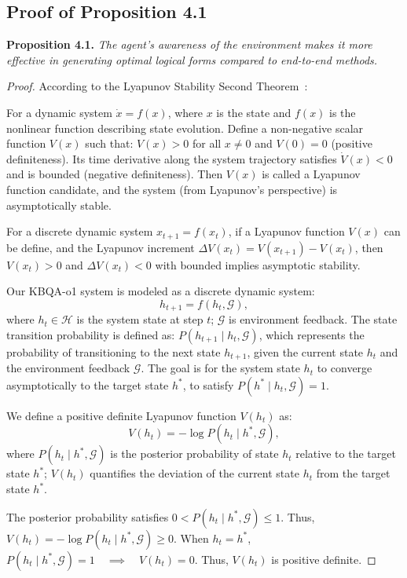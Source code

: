 \documentclass{article}
\theoremstyle{plain}
\theoremstyle{definition}
\theoremstyle{remark}
\begin{document}
\subsection{Proof of Proposition 4.1}
\label{proof1}
\textbf{Proposition 4.1.}
\textit{The agent's awareness of the environment makes it more effective in generating optimal logical forms compared to end-to-end methods.}
\begin{proof} 
According to the Lyapunov Stability Second Theorem~\cite{Lyapunov}: 

For a dynamic system $\dot{x} = f(x)$, where $x$ is the state and $f(x)$ is the nonlinear function describing state evolution. Define a non-negative scalar function $V(x)$  such that: $V(x) > 0$ for all $x \neq 0$ and $V(0) = 0$ (positive definiteness). Its time derivative along the system trajectory satisfies $\dot{V}(x)<0$ and is bounded (negative definiteness). Then $V(x)$ is called a Lyapunov function candidate, and the system (from Lyapunov’s perspective) is asymptotically stable.

For a discrete dynamic system  $x_{t+1} = f(x_t)$, if a Lyapunov function $V(x)$ can be define, and the Lyapunov increment $\Delta V(x_t) = V(x_{t+1}) - V(x_t)$, then $V(x_t) > 0$  and $\Delta V(x_t) < 0$ with bounded implies asymptotic stability.

Our KBQA-o1 system is modeled as a discrete dynamic system:
\begin{equation}
h_{t+1} = f(h_t, \mathcal{G}),
\end{equation}
where $h_t \in \mathcal{H}$ is the system state at step $t$; $\mathcal{G}$ is environment feedback.
The state transition probability is defined as: $P(h_{t+1} \mid h_t, \mathcal{G})$, which represents the probability of transitioning to the next state $h_{t+1}$, given the current state $h_t$ and the environment feedback $\mathcal{G}$.
The goal is for the system state $h_t$ to converge asymptotically to the target state $h^*$, to satisfy $P(h^* \mid h_t, \mathcal{G}) = 1$.

We define a positive definite Lyapunov function $V(h_t)$ as:
\begin{equation}
V(h_t) = -\log P(h_t \mid h^*, \mathcal{G}),
\end{equation}
where $P(h_t \mid h^*, \mathcal{G})$ is the posterior probability of state $h_t$ relative to the target state $h^*$; $V(h_t)$ quantifies the deviation of the current state $h_t$ from the target state $h^*$.

The posterior probability satisfies $0 < P(h_t \mid h^*, \mathcal{G}) \leq 1$. Thus, $V(h_t) = -\log P(h_t \mid h^*, \mathcal{G}) \geq 0$.
When $h_t = h^*$, $P(h_t \mid h^*, \mathcal{G}) = 1 \quad \implies \quad V(h_t) = 0$.
Thus, $V(h_t)$ is positive definite.


\end{proof}
\end{document}

